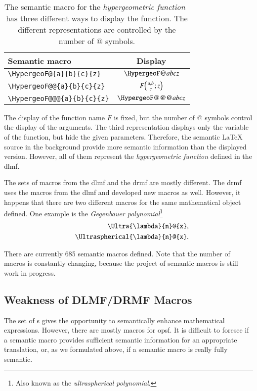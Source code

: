 \begin{table}[ht]
\centering
\begin{tabular}{lc}
	\hline
	Semantic macro & Display\\
	\hline
	\tableRowSpace \verb|\HypergeoF@{a}{b}{c}{z}| & $\HypergeoF@{a}{b}{c}{z}$\\
	\tableRowSpace \verb|\HypergeoF@@{a}{b}{c}{z}| & $F\!\left({\genfrac{}{}{0pt}{}{a, b}{c}}; z \right)$\\
	\tableRowSpace \verb|\HypergeoF@@@{a}{b}{c}{z}| & $\HypergeoF@@@{a}{b}{c}{z}$\\
	\hline
\end{tabular}
\caption{The semantic macro for the \textit{hypergeometric function}~\cite[(15.2.1)]{NIST:DLMF} has three different ways to display the function. The different representations are controlled by the number of $@$ symbols.}
\label{tab:hypergeo}
\end{table}

The display of the function name $F$ is fixed, but the number of $@$ symbols control the display of the arguments. The third representation displays only the variable of the function, but hide the given parameters. Therefore, the semantic \LaTeX{} source in the background provide more semantic information than the displayed version. However, all of them represent the \textit{hypergeometric function} defined in the \gls{dlmf}.

The sets of macros from the \gls{dlmf} and the \gls{drmf} are mostly different. The \gls{drmf} uses the macros from the \gls{dlmf} and developed new macros as well. However, it happens that there are two different macros for the same mathematical object defined. One example is the \textit{Gegenbauer polynomial}\footnote{Also known as the \textit{ultraspherical polynomial}.}
\begin{eqnarray}
	&&\verb|\Ultra{\lambda}{n}@{x}|,\\
	&&\verb|\Ultraspherical{\lambda}{n}@{x}|.
\end{eqnarray}

There are currently 685 semantic macros defined. Note that the number of macros is constantly changing, because the project of semantic macros is still work in progress.

\subsection{Weakness of DLMF/DRMF Macros}\label{subsec:semanticVSmacro}
The set of \Macro s gives the opportunity to semantically enhance mathematical expressions. However, there are mostly macros for \gls{opsf}. It is difficult to foresee if a semantic macro provides sufficient semantic information for an appropriate translation, or, as we formulated above, if a semantic macro is really fully semantic.


